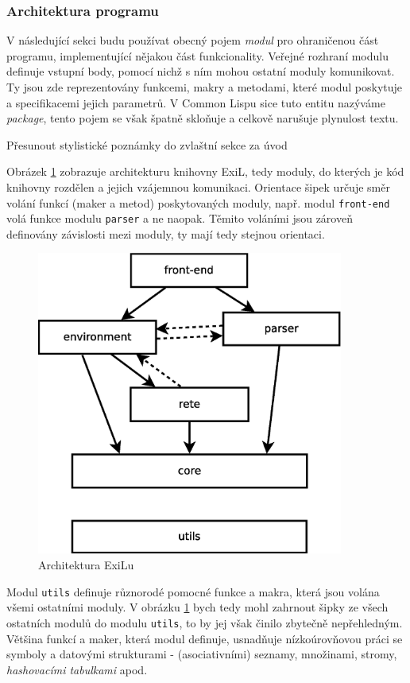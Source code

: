 \subsubsection{Architektura programu}

V následující sekci budu používat obecný pojem \emph{modul} pro ohraničenou část
programu, implementující nějakou část funkcionality. Veřejné rozhraní modulu
definuje vstupní body, pomocí nichž s ním mohou ostatní moduly komunikovat.
Ty jsou zde reprezentovány funkcemi, makry a metodami, které modul poskytuje
a specifikacemi jejich parametrů. V Common Lispu sice tuto entitu nazýváme
\emph{package}, tento pojem se však špatně skloňuje a celkově narušuje plynulost
textu.

\begin{framed}
  Přesunout stylistické poznámky do zvlaštní sekce za úvod
\end{framed}

Obrázek \ref{modules} zobrazuje architekturu knihovny ExiL, tedy moduly, do
kterých je kód knihovny rozdělen a jejich vzájemnou komunikaci. Orientace šipek
určuje směr volání funkcí (maker a metod) poskytovaných moduly, např. modul
\verb|front-end| volá funkce modulu \verb|parser| a ne naopak. Těmito voláními
jsou zároveň definovány závislosti mezi moduly, ty mají tedy stejnou orientaci.

\begin{figure}[h]
\centering
\includegraphics[height=10cm]{modules.eps}
\caption{Architektura ExiLu}
\label{modules}
\end{figure}

Modul \verb|utils| definuje různorodé pomocné funkce a makra, která jsou volána
všemi ostatními moduly. V obrázku \ref{modules} bych tedy mohl zahrnout šipky ze
všech ostatních modulů do modulu \verb|utils|, to by jej však činilo zbytečně
nepřehledným. Většina funkcí a maker, která modul definuje, usnadňuje
nízkoúrovňovou práci se symboly a datovými strukturami - (asociativními)
seznamy, množinami, stromy, \emph{hashovacími tabulkami} apod.

